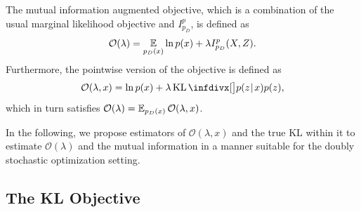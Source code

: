 
\begin{definition}
The mutual information augmented objective, which is a  combination of the usual marginal likelihood objective and $I_{p_D}^p$, is defined as
\begin{align}
\label{eq:cross-mi-obj}
\mathcal{O}(\lambda) = \mathop{{}\mathbb{E}}_{p_D(x)} \ln p(x) + \lambda I_{p_D}^p(X,Z).
\end{align}
Furthermore, the pointwise version of the objective is defined as
\begin{equation}
\label{eq:cross-mi-obj-x}
\mathcal{O}(\lambda,x) = \ln p(x) + \lambda \KL\Div[\big]{p(z\tmid x)}{p(z)},
\end{equation}
which in turn satisfies $\mathcal{O}(\lambda) = \mathop{{}\mathbb{E}}_{p_D(x)} \mathcal{O}(\lambda,x)$.
\end{definition}

In the following, we propose estimators of $\mathcal{O}(\lambda,x)$ and the true KL within it to estimate $\mathcal{O}(\lambda)$ and the mutual information in a manner suitable for the doubly stochastic optimization setting.

\subsection{The KL Objective}

